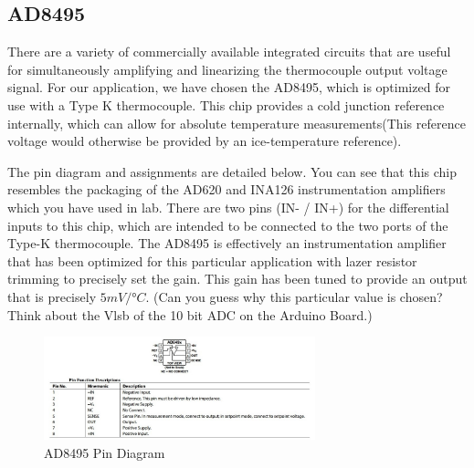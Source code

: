 \documentclass[10pt]{report}
\begin{document}
\subsection*{AD8495}
	There are a variety of commercially available integrated circuits that are useful for simultaneously amplifying and linearizing the thermocouple output voltage signal. For our application, we have chosen the AD8495, which is optimized for use with a Type K thermocouple. This chip provides a cold junction reference internally, which can allow for absolute temperature measurements(This reference voltage would otherwise be provided by an ice-temperature reference). 
\par
	The pin diagram and assignments are detailed below. You can see that this chip resembles the packaging of the AD620 and INA126 instrumentation amplifiers which you have used in lab. There are two pins (IN-  /  IN+) for the differential inputs to this chip, which are intended to be connected to the two ports of the Type-K thermocouple. The AD8495 is effectively an instrumentation amplifier that has been optimized for this particular application with lazer resistor trimming to precisely set the gain. This gain has been tuned to provide an output that is precisely $5 mV/°C$. (Can you guess why this particular value is chosen? Think about the Vlsb of the 10 bit ADC on the Arduino Board.)

\begin{figure}[H]
\centering
   \includegraphics[width=0.7\textwidth]{AD8495_Pins.jpg}
    \caption{AD8495 Pin Diagram}
\end{figure}
\end{document}
